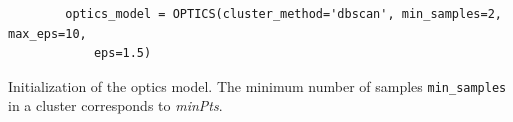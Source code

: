 \begin{listing}[htp]
    \begin{verbatim}
        optics_model = OPTICS(cluster_method='dbscan', min_samples=2, max_eps=10, 
            eps=1.5)
    \end{verbatim}
    \caption[Initialization of the \ac{optics} model]{Initialization of the \ac{optics} model.
    The minimum number of samples \texttt{min\_samples} in a cluster corresponds to \textit{minPts}.
    }
    \label{lst:optics_model}
\end{listing}
